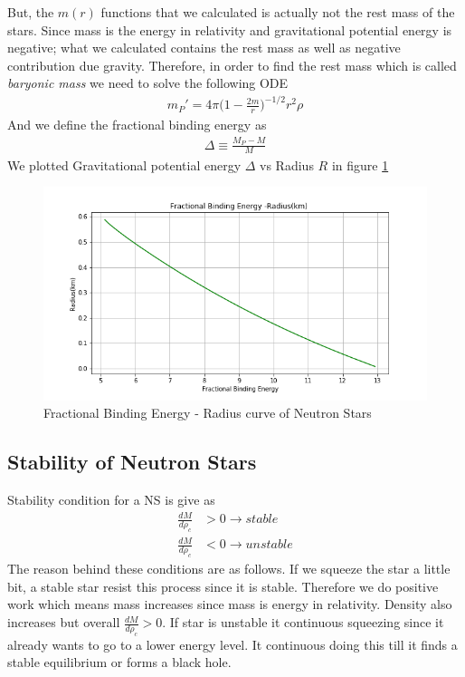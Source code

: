 \documentclass[aps,twocolumn,showpacs,preprintnumbers,nofootinbib,prl,superscriptaddress,groupedaddress]{revtex4-1}
\begin{document}
But, the $m(r)$ functions that we calculated is actually not the rest mass of the stars. Since mass is the energy in relativity and gravitational potential energy is negative; what we calculated contains the rest mass as well as negative contribution due gravity. Therefore, in order to find the rest mass which is called \textit{baryonic mass} we need to solve the following ODE
\begin{align}\label{baryonic}
	m_P' = 4\pi\bigg(1 - \frac{2m}{r})^{-1/2} r^2\rho
\end{align}
And we define the fractional binding energy  as
\begin{align}\label{fractional}
	\Delta \equiv \frac{M_P - M}{M}
\end{align}
We plotted Gravitational potential energy $\Delta$ vs Radius $R$ in figure \ref{fig:fractional-binding-energy-of-neutron-stars}
\begin{figure}
	\centering
	\includegraphics[width=1.0\linewidth]{"Figures/Figures_Einstein/Fractional Binding Energy of Neutron Stars"}
	\caption{Fractional Binding Energy - Radius curve of Neutron Stars}
	\label{fig:fractional-binding-energy-of-neutron-stars}
\end{figure}

\subsection{Stability of Neutron Stars}
Stability condition for a NS is give as
\begin{align}\label{stability}
	\frac{dM}{d\rho_c} &> 0 \rightarrow stable\\
	\frac{dM}{d\rho_c} &< 0 \rightarrow unstable \nonumber
\end{align}
The reason behind these conditions are as follows. If we squeeze the star a little bit, a stable star resist this process since it is stable. Therefore we do positive work which means mass increases since mass is energy in relativity. Density also increases but overall $ \frac{dM}{d\rho_c} > 0 $. If star is unstable it continuous squeezing since it already wants to go to a lower energy level. It continuous doing this till it finds a stable equilibrium or forms a black hole. 
\end{document}
